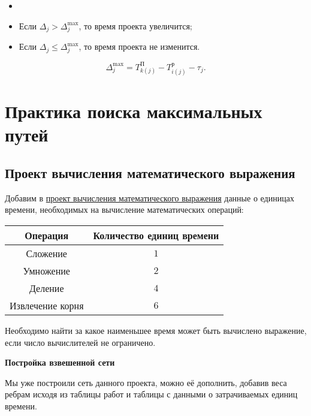 \implication

\begin{itemize}[nosep]
	\item[]
	
	\item Если $\Delta_j > \Delta_j^{\max}$, то время проекта увеличится;
	
	\item Если $\Delta_j \le \Delta_j^{\max}$, то время проекта не изменится.
\end{itemize}

\implication

\[
\Delta_j^{\max} = T_{k(j)}^{\text{П}} - T_{i(j)}^{\text{р}} - \tau_j.
\]

\section{Практика поиска максимальных путей}

\subsection{Проект вычисления математического выражения}

Добавим в \hyperref[proj:math_expr_calc_project]{проект вычисления математического выражения} данные о единицах времени, необходимых на вычисление математических операций:

\begin{table}[H]
	\centering
	\begin{tabular}{ | c | c | } 
		\hline
		Операция & Количество единиц времени \\ \hline
		Сложение & $1$ \\ \hline
		Умножение & $2$ \\ \hline
		Деление & $4$ \\ \hline
		Извлечение корня & $6$ \\ \hline
	\end{tabular}
\end{table}

Необходимо найти за какое наименьшее время может быть вычислено выражение, если число вычислителей не ограничено.

\bigskip

\textbf{Постройка взвешенной сети}

Мы уже построили сеть данного проекта, можно её дополнить, добавив веса ребрам исходя из таблицы работ и таблицы с данными о затрачиваемых единиц времени.

